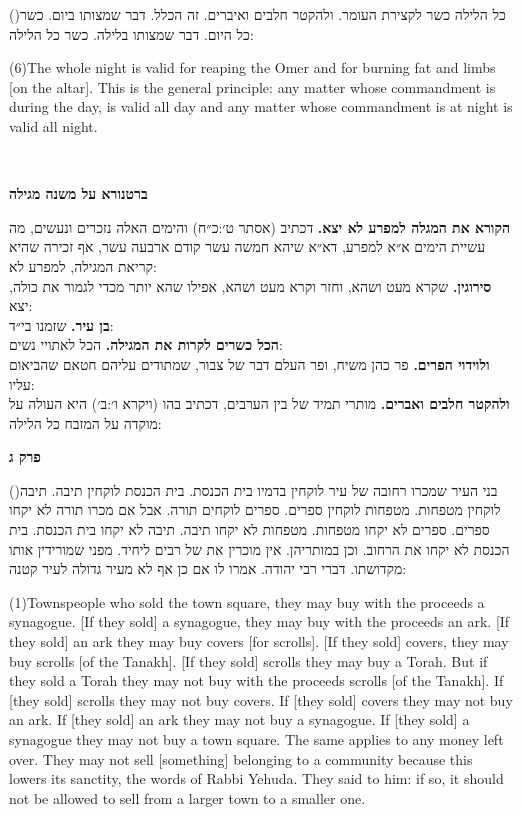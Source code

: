 \documentclass[12pt, openany]{book}
\newcommand{\sethebfont}{
\fontsize{10.5pt}{13.1pt} \selectfont
}
\newcommand{\LTRmark}{‎}
\newcommand{\hebeng}[2]{
	{\sethebfont #1}
	
	{\beginL\englishfont\sethebfont{\raggedright #2 \hfill} \LTRmark\endL}
	
	\vspace{\baselineskip}
}
\newcommand{\chapname}{}
\newcommand{\sectname}{}
\newcommand{\newchap}[1]{
	\addcontentsline{toc}{chapter}{#1}
	\renewcommand{\chapname}{#1}
		\begin{center}
			\textbf{%
\fontsize{16pt}{16pt}\selectfont
				#1}
		\end{center}
}
\newcommand{\newsection}[1]{
	\renewcommand{\sectname}{#1}	
	\vspace{-\baselineskip}
	\begin{center}
		\textbf{%
\fontsize{16pt}{16pt}\selectfont
			#1}
	\end{center}
	\vspace{-\baselineskip}
	\nopagebreak
}
\newcommand{\blockcomment}[2]{ 
\vspace{\baselineskip}
\newsection{#1}
\sethebfont	\textsf{#2}
\vspace{\baselineskip}}
\newcommand{\vsnum}[1]{(\hebrewnumeral{#1})\space}
\newcommand{\vsnumeng}[1]{(#1)\space}
\begin{document}
\hebeng{\vsnum{6}כל הלילה כשר לקצירת העומר. ולהקטר חלבים ואיברים. זה הכלל. דבר שמצותו ביום. כשר כל היום. דבר שמצותו בלילה. כשר כל הלילה: }{\vsnumeng{6}The whole night is valid for reaping the Omer and for burning fat and limbs {[on the altar]}. This is the general principle: any matter whose commandment is during the day, is valid all day and any matter whose commandment is at night is valid all night.}%

\blockcomment{ברטנורא על משנה מגילה}{\textrm{\textbf{הקורא את המגלה למפרע לא יצא.}} דכתיב (אסתר ט׳:כ״ח) והימים האלה נזכרים ונעשים, מה עשיית הימים א״א למפרע, דא״א שיהא חמשה עשר קודם ארבעה עשר, אף זכירה שהיא קריאת המגילה, למפרע לא:\\\textrm{\textbf{סירוגין.}} שקרא מעט ושהא, וחזר וקרא מעט ושהא, אפילו שהא יותר מכדי לגמור את כולה, יצא:\\\textrm{\textbf{בן עיר.}} שזמנו בי״ד:\\\textrm{\textbf{הכל כשרים לקרות את המגילה.}} הכל לאתויי נשים:\\\textrm{\textbf{ולוידוי הפרים.}} פר כהן משיח, ופר העלם דבר של צבור, שמתודים עליהם חטאם שהביאום עליו:\\\textrm{\textbf{ולהקטר חלבים ואברים.}} מותרי תמיד של בין הערבים, דכתיב בהו (ויקרא ו׳:ב׳) היא העולה על מוקדה על המזבח כל הלילה:\\
}%
\newchap{פרק ג}
\hebeng{\vsnum{1}בני העיר שמכרו רחובה של עיר לוקחין בדמיו בית הכנסת. בית הכנסת לוקחין תיבה. תיבה לוקחין מטפחות. מטפחות לוקחין ספרים. ספרים לוקחים תורה. אבל אם מכרו תורה לא יקחו ספרים. ספרים לא יקחו מטפחות. מטפחות לא יקחו תיבה. תיבה לא יקחו בית הכנסת. בית הכנסת לא יקחו את הרחוב. וכן במותריהן. אין מוכרין את של רבים ליחיד. מפני שמורידין אותו מקדושתו. דברי רבי יהודה. אמרו לו אם כן אף לא מעיר גדולה לעיר קטנה: }{\vsnumeng{1}Townspeople who sold the town square, they may buy with the proceeds a synagogue. {[If they sold]} a synagogue, they may buy with the proceeds an ark. {[If they sold]} an ark they may buy covers {[for scrolls]}. {[If they sold]} covers, they may buy scrolls {[of the Tanakh]}. {[If they sold]} scrolls they may buy a Torah. But if they sold a Torah they may not buy with the proceeds scrolls {[of the Tanakh]}. If {[they sold]} scrolls they may not buy covers. If {[they sold]} covers they may not buy an ark. If {[they sold]} an ark they may not buy a synagogue. If {[they sold]} a synagogue they may not buy a town square. The same applies to any money left over. They may not sell {[something]} belonging to a community because this lowers its sanctity, the words of Rabbi Yehuda. They said to him: if so, it should not be allowed to sell from a larger town to a smaller one.}%
\end{document}
